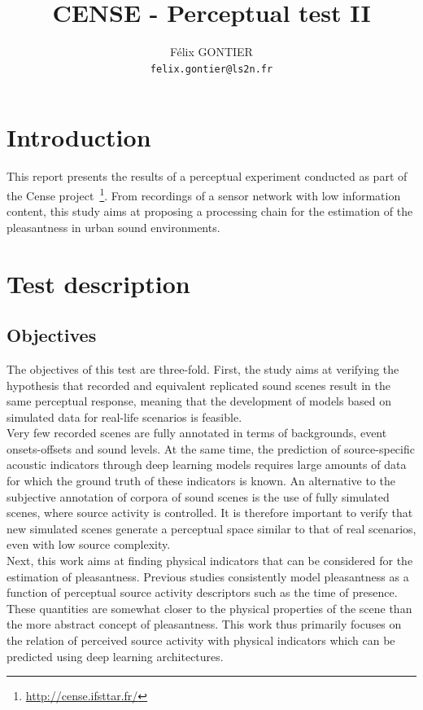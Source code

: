 \documentclass[11pt,a4paper]{article}
\begin{document}
\author{F\'elix GONTIER \\ \texttt{felix.gontier@ls2n.fr}}
\title{CENSE - Perceptual test II}
\maketitle

\section{Introduction}

This report presents the results of a perceptual experiment conducted as part of the Cense project~\footnote{\url{http://cense.ifsttar.fr/}}. From recordings of a sensor network with low information content, this study aims at proposing a processing chain for the estimation of the pleasantness in urban sound environments.

\section{Test description}
\subsection{Objectives}
\label{sec:test_obj}

The objectives of this test are three-fold. First, the study aims at verifying the hypothesis that recorded and equivalent replicated sound scenes result in the same perceptual response, meaning that the development of models based on simulated data for real-life scenarios is feasible.\\

Very few recorded scenes are fully annotated in terms of backgrounds, event onsets-offsets and sound levels. At the same time, the prediction of source-specific acoustic indicators through deep learning models requires large amounts of data for which the ground truth of these indicators is known. An alternative to the subjective annotation of corpora of sound scenes is the use of fully simulated scenes, where source activity is controlled. It is therefore important to verify that new simulated scenes generate a perceptual space similar to that of real scenarios, even with low source complexity.\\

Next, this work aims at finding physical indicators that can be considered for the estimation of pleasantness. Previous studies consistently model pleasantness as a function of perceptual source activity descriptors such as the time of presence. These quantities are somewhat closer to the physical properties of the scene than the more abstract concept of pleasantness. This work thus primarily focuses on the relation of perceived source activity with physical indicators which can be predicted using deep learning architectures.
\end{document}
